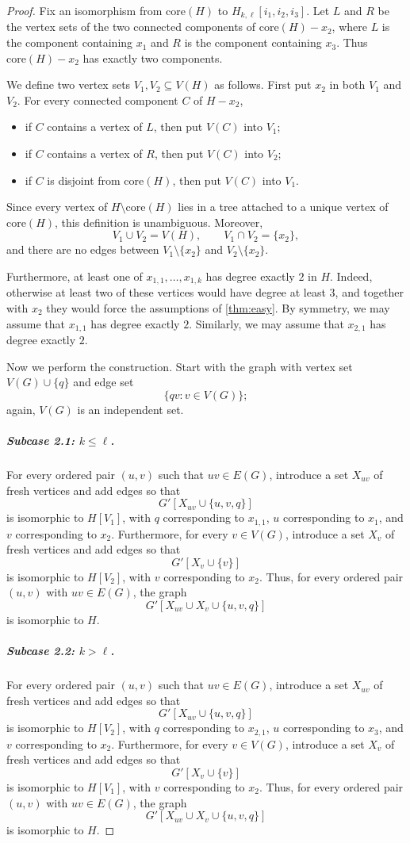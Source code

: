 \documentclass[a4paper,UKenglish,cleveref, autoref, thm-restate]{lipics-v2021}
\newcommand{\core}{\mathrm{core}}
\begin{document}
\begin{proof}
Fix an isomorphism from $\core(H)$ to $H_{k,\ell}[i_1,i_2,i_3]$.
Let $L$ and $R$ be the vertex sets of the two connected components of $\core(H)-x_2$, where $L$ is the component containing $x_1$ and $R$ is the component containing $x_3$.
Thus $\core(H)-x_2$ has exactly two components.

We define two vertex sets $V_1,V_2\subseteq V(H)$ as follows.
First put $x_2$ in both $V_1$ and $V_2$.
For every connected component $C$ of $H-x_2$,
\begin{itemize}
    \item if $C$ contains a vertex of $L$, then put $V(C)$ into $V_1$;
    \item if $C$ contains a vertex of $R$, then put $V(C)$ into $V_2$;
    \item if $C$ is disjoint from $\core(H)$, then put $V(C)$ into $V_1$.
\end{itemize}
Since every vertex of $H\setminus \core(H)$ lies in a tree attached to a unique vertex of $\core(H)$, this definition is unambiguous.
Moreover,
\[
V_1\cup V_2=V(H), \qquad V_1\cap V_2=\{x_2\},
\]
and there are no edges between $V_1\setminus \{x_2\}$ and $V_2\setminus \{x_2\}$.

Furthermore, at least one of $x_{1,1},\ldots,x_{1,k}$ has degree exactly $2$ in $H$.
Indeed, otherwise at least two of these vertices would have degree at least $3$, and together with $x_2$ they would force the assumptions of \cref{thm:easy}.
By symmetry, we may assume that $x_{1,1}$ has degree exactly $2$.
Similarly, we may assume that $x_{2,1}$ has degree exactly $2$.

Now we perform the construction.
Start with the graph with vertex set $V(G)\cup \{q\}$ and edge set
\[
\{qv : v\in V(G)\};
\]
again, $V(G)$ is an independent set.

\subparagraph*{Subcase 2.1: \boldmath $k\leq \ell$.}
For every ordered pair $(u,v)$ such that $uv\in E(G)$, introduce a set $X_{uv}$ of fresh vertices and add edges so that
\[
G'[X_{uv}\cup \{u,v,q\}]
\]
is isomorphic to $H[V_1]$, with $q$ corresponding to $x_{1,1}$, $u$ corresponding to $x_1$, and $v$ corresponding to $x_2$.
Furthermore, for every $v\in V(G)$, introduce a set $X_v$ of fresh vertices and add edges so that
\[
G'[X_v\cup \{v\}]
\]
is isomorphic to $H[V_2]$, with $v$ corresponding to $x_2$.
Thus, for every ordered pair $(u,v)$ with $uv\in E(G)$, the graph
\[
G'[X_{uv}\cup X_v\cup \{u,v,q\}]
\]
is isomorphic to $H$.

\subparagraph*{Subcase 2.2: \boldmath $k>\ell$.}
For every ordered pair $(u,v)$ such that $uv\in E(G)$, introduce a set $X_{uv}$ of fresh vertices and add edges so that
\[
G'[X_{uv}\cup \{u,v,q\}]
\]
is isomorphic to $H[V_2]$, with $q$ corresponding to $x_{2,1}$, $u$ corresponding to $x_3$, and $v$ corresponding to $x_2$.
Furthermore, for every $v\in V(G)$, introduce a set $X_v$ of fresh vertices and add edges so that
\[
G'[X_v\cup \{v\}]
\]
is isomorphic to $H[V_1]$, with $v$ corresponding to $x_2$.
Thus, for every ordered pair $(u,v)$ with $uv\in E(G)$, the graph
\[
G'[X_{uv}\cup X_v\cup \{u,v,q\}]
\]
is isomorphic to $H$.


\end{proof}
\end{document}

